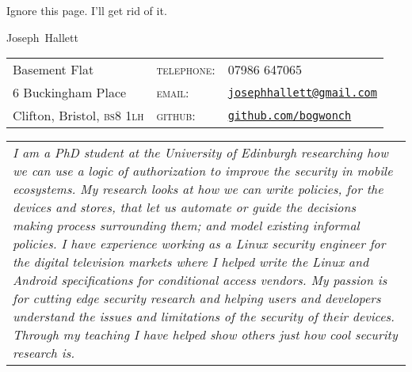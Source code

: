\documentclass[a4paper,10pt,selectp]{book}
\newcommand{\lowercaps}[1]{\textsc{\MakeLowercase{#1}}}
\newcommand{\heading}[1]{{{\color{BrickRed}\hspace{1em}\Huge #1}\vspace{0.5em}}}
\newcommand{\email}[1]{\href{mailto:#1}{#1}}
\newcommand{\postcode}[1]{\lowercaps{#1}}
\begin{document}
Ignore this page.  I'll get rid of it.
\newpage

\heading{Joseph~Hallett}

\begin{tabular}{l@{\hspace{12em}} l@{\hspace{1em}} l}
Basement Flat & \textsc{telephone:} & 07986 647065 \\
6 Buckingham Place & \textsc{email:} & \email{\tt josephhallett@gmail.com} \\
Clifton, Bristol, \postcode{bs8 1lh} & \textsc{github:} & \href{https://www.github.com/bogwonch}{\tt github.com/bogwonch} \\
\end{tabular}

\vspace{1em} \begin{tabular}{p{\textwidth}}\itshape I am a PhD student at the
  University of Edinburgh researching how we can use a logic of authorization to
  improve the security in mobile ecosystems.  My research looks at how we can
  write policies, for the devices and stores, that let us automate or
  guide the decisions making process surrounding them; and model existing
  informal policies.  I have experience working as a Linux
  security engineer for the digital television markets where I helped write the
  Linux and Android specifications for conditional access vendors.  My passion
  is for cutting edge security research and helping users and developers
  understand the issues and limitations of the security of their devices.
  Through my teaching I have helped show others just how cool security research
is.  \end{tabular} \vspace{0.3em}
\end{document}

